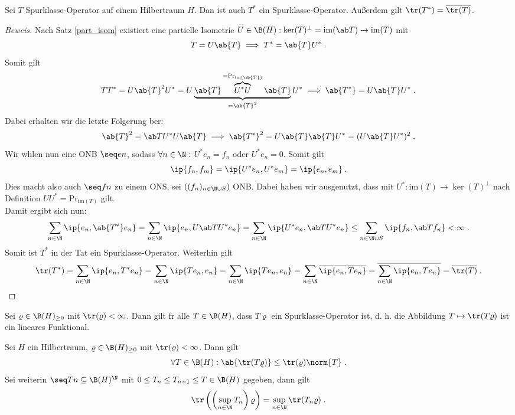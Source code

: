 \begin{theorem}
	Sei $T$ Spurklasse-Operator auf einem Hilbertraum $H$. Dan ist auch $T^*$ ein Spurklasse-Operator. Au\ss{}erdem gilt \(\tr(T^*) = \overline{\tr(T)}\).
\end{theorem}
\begin{proof}[Beweis]
	Nach Satz \ref{part_isom} existiert eine partielle Isometrie \(U\in\B(H): \ker(T)^\perp = \text{im}(\ab T) \to \text{im}(T)\) mit
	\[T = U\ab{T} \implies T^* = \ab{T}U^*\;.\]
	Somit gilt 
	\[TT^* = U\ab{T}^2 U^* = U\underbrace{\ab{T}\overbrace{U^* U}^{=\text{Pr}_{\text{im}(\ab{T})}} \ab{T}}_{=\ab{T}^2} U^* \implies \ab{T^*} = U\ab{T} U^*\;.\]
	Dabei erhalten wir die letzte Folgerung \us ber: 
	\[\ab{T}^2 = \ab T U^* U \ab{T} \implies \ab{T^*}^2 = U\ab{T}\ab{T}U^* = (U\ab{T}U^*)^2\;.\]
	Wir w\as hlen nun eine ONB \(\seq en\), sodass \(\forall n \in\N:\) \(U^* e_n = f_n\) oder \(U^* e_n = 0\). Somit gilt
	\[\ip{f_n, f_m} = \ip{U^* e_n, U^* e_m} = \ip{e_n, e_m} \;.\]
	Dies macht also auch \(\seq f n\) zu einem ONS, sei \(((f_n)_{n\in\N\cup S})\) ONB. Dabei haben wir ausgenutzt, dass mit \(U^*:  \text{im}(T) \to \ker(T)^\perp\) nach Definition \(UU^* = \text{Pr}_{\text{im}(T)}\) gilt.\\
	Damit ergibt sich nun:
	\[\sum_{n\in\N}\ip{e_n, \ab{T^*} e_n} = \sum_{n\in\N}\ip{e_n, U\ab T U^* e_n} = \sum_{n\in\N}\ip{U^* e_n, \ab T U^* e_n} \leq \sum_{n\in\N\cup S} \ip{f_n, \ab T f_n} < \infty\;.\]
	Somit ist \(T^*\) in der Tat ein Spurklasse-Operator. Weiterhin gilt
	\[\tr(T^*) = \sum_{n\in\N} \ip{e_n, T^* e_n} = \sum_{n\in\N}\ip{T e_n, e_n} = \sum_{n\in\N}\ip{Te_n, e_n} = \sum_{n\in\N} \overline{\ip{e_n, T e_n}} = \overline{\sum_{n\in\N}\ip{e_n, Te_n}} = \overline{\tr(T)}\;.\]
\end{proof}

\begin{rem}
	Sei \(\varrho\in \B(H)_{\geq 0}\) mit \(\tr(\varrho)<\infty\). Dann gilt f\us r alle \(T \in \B(H)\), dass \(T\varrho\) ein Spurklasse-Operator ist, d. h. die Abbildung \(T\mapsto \tr(T\varrho)\) ist ein lineares Funktional.
\end{rem}

\begin{theorem}
	Sei $H$ ein Hilbertraum, \(\varrho \in \B(H)_{\geq 0}\) mit \(\tr(\varrho) < \infty\). Dann gilt
	\[\forall T\in \B(H): \ab{\tr(T\varrho)} \leq \tr(\varrho) \norm{T}\;.\]
	Sei weiterin \(\seq Tn \subseteq \B(H)^\N\) mit \(0\leq T_n\leq T_{n+1} \leq T\in \B(H)\) gegeben, dann gilt
	\[\tr\left(\left(\sup_{n\in\N}T_n\right)\varrho\right) = \sup_{n\in\N} \tr(T_n\varrho)\;.\] 
\end{theorem}

